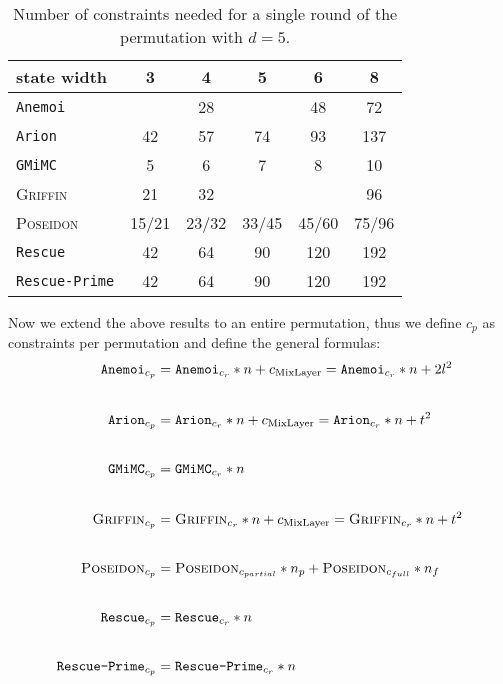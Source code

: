\documentclass[12pt, a4paper]{report}
\begin{document}
\begin{table}[H]
  \begin{center}
    \begin{tabular}{|l|c|c|c|c|c|}
      \hline
        state width & 3 & 4 & 5 & 6 & 8 \\
      \hline
        \texttt{Anemoi} & & 28 &  & 48 & 72 \\
        \texttt{Arion} & 42 & 57 & 74 & 93 & \cellcolor{orange!35} 137 \\
        \texttt{GMiMC} & \cellcolor{green!35} 5 & 6 & 7 & 8 & 10 \\
        \textsc{Griffin} & 21 & 32 & & & 96 \\
        \textsc{Poseidon} & 15/21 & 23/32 & 33/45 & 45/60 & 75/96 \\
        \texttt{Rescue} & 42 & 64 & 90 & \cellcolor{orange!35} 120 & \cellcolor{red!35} 192 \\
        \texttt{Rescue-Prime} & 42 & 64 & 90 & \cellcolor{orange!35} 120 & \cellcolor{red!35} 192 \\
      \hline
    \end{tabular}
  \end{center}
  \caption{Number of constraints needed for a single round of the permutation with $d = 5$.}\label{tab:constraintsround}
\end{table}

Now we extend the above results to an entire permutation, thus we define $c_p$ as constraints per permutation and define the general formulas:
\begin{align*}
  \texttt{Anemoi}_{c_p} &= \texttt{Anemoi}_{c_r} * n + c_{\text{MixLayer}} = \texttt{Anemoi}_{c_r} * n + 2l^2 \\[20pt]
  \texttt{Arion}_{c_p} &= \texttt{Arion}_{c_r} * n + c_{\text{MixLayer}} = \texttt{Arion}_{c_r} * n + t^2 \\[20pt]
  \texttt{GMiMC}_{c_p} &= \texttt{GMiMC}_{c_r} * n \\[20pt]
  \textsc{Griffin}_{c_p} &= \textsc{Griffin}_{c_r} * n + c_{\text{MixLayer}} = \textsc{Griffin}_{c_r} * n + t^2 \\[20pt]
  \textsc{Poseidon}_{c_p} &= \textsc{Poseidon}_{c_{partial}} * n_p + \textsc{Poseidon}_{c_{full}} * n_f \\[20pt]
  \texttt{Rescue}_{c_p} &= \texttt{Rescue}_{c_r} * n \\[20pt]
  \texttt{Rescue-Prime}_{c_p} &= \texttt{Rescue-Prime}_{c_r} * n
\end{align*}
\end{document}
